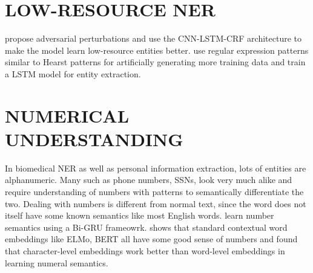 \section{LOW-RESOURCE NER}
\cite{zhou2019dual} propose adversarial perturbations and use the CNN-LSTM-CRF architecture to make the model learn low-resource entities better. \cite{arora2017extracting} use regular expression patterns similar to Hearst patterns for artificially generating more training data and train a LSTM model for entity extraction.

\section{NUMERICAL UNDERSTANDING}
In biomedical NER as well as personal information extraction, lots of entities are alphanumeric. Many such as phone numbers, SSNs, look very much alike and require understanding of numbers with patterns to semantically differentiate the two. Dealing with numbers is different from normal text, since the word does not itself have some known semantics like most English words. \cite{chen2019numeracy} learn number semantics using a Bi-GRU frameowrk. \cite{wallace2019nlp} shows that standard contextual word embeddings like ELMo\cite{peters2018deep}, BERT\cite{devlin2018bert} all have some good sense of numbers and found that character-level embeddings work better than word-level embeddings in learning numeral semantics.
